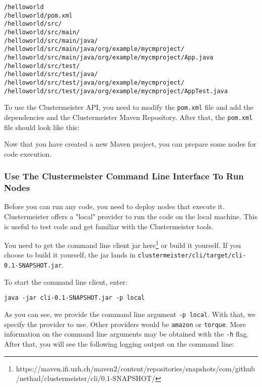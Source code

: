 \documentclass{article}
\begin{document}
\begin{lstlisting}[breaklines=true, backgroundcolor=\color{lbcolor}]
/helloworld
/helloworld/pom.xml
/helloworld/src/
/helloworld/src/main/
/helloworld/src/main/java/
/helloworld/src/main/java/org/example/mycmproject/
/helloworld/src/main/java/org/example/mycmproject/App.java
/helloworld/src/test/
/helloworld/src/test/java/
/helloworld/src/test/java/org/example/mycmproject/
/helloworld/src/test/java/org/example/mycmproject/AppTest.java
\end{lstlisting}

To use the Clustermeister API, you need to modify the \texttt{pom.xml} file and add the dependencies and the Clustermeister Maven Repository. After that, the \texttt{pom.xml} file should look like this:



Now that you have created a new Maven project, you can prepare some nodes for code execution.

\subsubsection{Use The Clustermeister Command Line Interface To Run Nodes}

Before you can run any code, you need to deploy nodes that execute it. Clustermeister offers a "local" provider to run the code on the local machine. This is useful to test code and get familiar with the Clustermeister tools.

You need to get the command line client jar here\footnote{https://maven.ifi.uzh.ch/maven2/content/repositories/snapshots/com/github/nethad/clustermeister/cli/0.1-SNAPSHOT/} or build it yourself. If you choose to build it yourself, the jar lands in \texttt{clustermeister/cli/target/cli-0.1-SNAPSHOT.jar}.

To start the command line client, enter:

\begin{lstlisting}[breaklines=true, backgroundcolor=\color{lbcolor}]
java -jar cli-0.1-SNAPSHOT.jar -p local 
\end{lstlisting}

As you can see, we provide the command line argument \texttt{-p local}. With that, we specify the provider to use. Other providers would be \texttt{amazon} or \texttt{torque}. More information on the command line arguments may be obtained with the \texttt{-h} flag. After that, you will see the following logging output on the command line:
\end{document}
